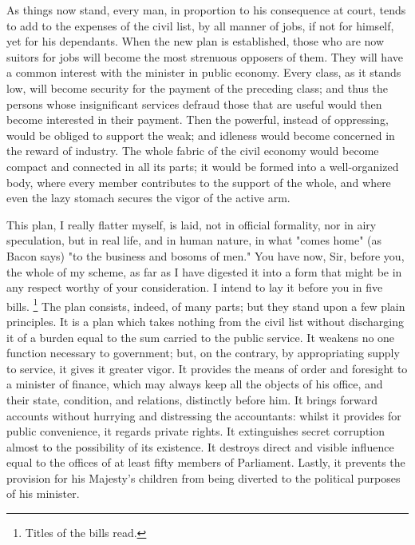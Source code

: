 As things now stand, every man, in proportion to his consequence at court, tends to add to the expenses of the civil list, by all manner of jobs, if not for himself, yet for his dependants. When the new plan is established, those who are now suitors for jobs will become the most strenuous opposers of them. They will have a common interest with the minister in public economy. Every class, as it stands low, will become security for the payment of the preceding class; and thus the persons whose insignificant services defraud those that are useful would then become interested in their payment. Then the powerful, instead of oppressing, would be obliged to support the weak; and idleness would become concerned in the reward of industry. The whole fabric of the civil economy would become compact and connected in all its parts; it would be formed into a well-organized body, where every member contributes to the support of the whole, and where even the lazy stomach secures the vigor of the active arm.

This plan, I really flatter myself, is laid, not in official formality, nor in airy speculation, but in real life, and in human nature, in what "comes home" (as Bacon says) "to the business and bosoms of men." You have now, Sir, before you, the whole of my scheme, as far as I have digested it into a form that might be in any respect worthy of your consideration. I intend to lay it before you in five bills.
\footnote{ Titles of the bills read.}
 The plan consists, indeed, of many parts; but they stand upon a few plain principles. It is a plan which takes nothing from the civil list without discharging it of a burden equal to the sum carried to the public service. It weakens no one function necessary to government; but, on the contrary, by appropriating supply to service, it gives it greater vigor. It provides the means of order and foresight to a minister of finance, which may always keep all the objects of his office, and their state, condition, and relations, distinctly before him. It brings forward accounts without hurrying and distressing the accountants: whilst it provides for public convenience, it regards private rights. It extinguishes secret corruption almost to the possibility of its existence. It destroys direct and visible influence equal to the offices of at least fifty members of Parliament. Lastly, it prevents the provision for his Majesty's children from being diverted to the political purposes of his minister.

